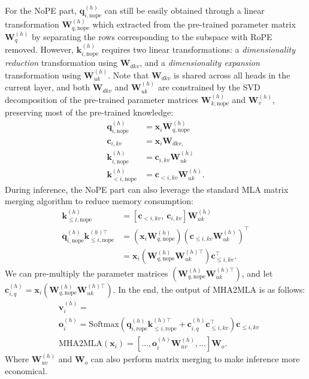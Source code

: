 For the NoPE part, \(\bm{q}_{i,\text{nope}}^{(h)}\) can still be easily obtained through a linear transformation $\bm{W}_{q,\text{nope}}^{(h)}$ which extracted from the pre-trained parameter matrix \( \bm{W}_q^{(h)} \) by separating the rows corresponding to the subspace with RoPE removed.  
However, \(\bm{k}_{i,\text{nope}}^{(h)}\) requires two linear transformations:  a \textit{dimensionality reduction} transformation using \(\bm{W}_{dkv}\), and a \textit{dimensionality expansion} transformation using \(\bm{W}_{uk}^{(h)}\).  
Note that \(\bm{W}_{dkv}\) is shared across all heads in the current layer, and both \(\bm{W}_{dkv}\) and \(\bm{W}_{uk}^{(h)}\) are constrained by the SVD decomposition of the pre-trained parameter matrices \(\bm{W}_{k,\text{nope}}^{(h)}\) and \(\bm{W}_{v}^{(h)}\), preserving most of the pre-trained knowledge:
\begin{align*}  
\bm{q}_{i,\text{nope}}^{(h)} &= \bm{x}_i\bm{W}_{q,
\text{nope}}^{(h)}\\
\bm{c}_{i, kv} &= \bm{x}_i\bm{W}_{dkv,
}\\
\bm{k}_{i,\text{nope}}^{(h)} &= \bm{c}_{i, kv}\bm{W}_{uk}^{(h)}\\
\bm{k}_{<i, \text{nope}}^{(h)} &= \bm{c}_{<i, kv}\bm{W}_{uk}^{(h)}.
\end{align*}
During inference, the NoPE part can also leverage the standard MLA matrix merging algorithm to reduce memory consumption:
\begin{align*}
\bm{k}_{\le i, \text{nope}}^{(h)} &= [\bm{c}_{<i, kv},~ \bm{c}_{i, kv}]\bm{W}_{uk}^{(h)}\\
 \bm{q}_{i,\text{nope}}^{(h)} \bm{k}_{\le i,\text{nope}}^{(h)\top} & = (\bm{x}_i\bm{W}_{q,
\text{nope}}^{(h)})  (\bm{c}_{\le i, kv}\bm{W}_{uk}^{(h)})^\top \\
 & = \bm{x}_i (\bm{W}_{q,
\text{nope}}^{(h)} \bm{W}_{uk}^{(h)\top}) \bm{c}_{\le i, kv}^\top.
\end{align*}
We can pre-multiply the parameter matrices $(\bm{W}_{q,
\text{nope}}^{(h)} \bm{W}_{uk}^{(h)\top})$, and let $\bm{c}_{ i, q}^{(h)} = \bm{x}_i (\bm{W}_{q, \text{nope}}^{(h)} \bm{W}_{uk}^{(h)\top})$.
In the end, the output of MHA2MLA is as follows:
\begin{align*}    
& \bm{v}_i^{(h)} = \\
&\bm{o}_i^{(h)}\!=\!\text{Softmax}\!\left(\bm{q}_{i,\text{rope}}^{(h)}\bm{k}_{\le i,\text{rope}}^{(h)\top}\!+\!\bm{c}_{i, q}^{(h)}\bm{c}_{\le i, kv}^\top\!\right) \bm{c}_{\le i, kv} \nonumber 
    \\ &\text{MHA2MLA}(\bm{x}_i) = \left[\dots, \bm{o}_i^{(h)}\bm{W}_{uv}^{(h)},  \dots\right]  \bm{W}_o.
\end{align*}
Where $\bm{W}_{uv}^{(h)}$ and $\bm{W}_o$ can also perform matrix merging to make inference more economical.


